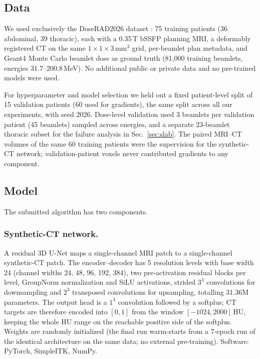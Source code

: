 \documentclass[runningheads]{llncs}
\begin{document}
\subsection{Data}
We used exclusively the DoseRAD2026 dataset \cite{doserad_data}: 75 training patients (36 abdominal, 39 thoracic), each with a 0.35\,T bSSFP planning MRI, a deformably registered CT on the same $1\times1\times3$\,mm$^3$ grid, per-beamlet plan metadata, and Geant4 \cite{geant4} Monte Carlo beamlet dose as ground truth (81{,}000 training beamlets, energies 31.7--200.8\,MeV). No additional public or private data and no pre-trained models were used.

For hyperparameter and model selection we held out a fixed patient-level split of 15 validation patients (60 used for gradients), the same split across all our experiments, with seed 2026. Dose-level validation used 3 beamlets per validation patient (45 beamlets) sampled across energies, and a separate 23-beamlet thoracic subset for the failure analysis in Sec.~\ref{sec:slab}. The paired MRI--CT volumes of the same 60 training patients were the supervision for the synthetic-CT network; validation-patient voxels never contributed gradients to any component.

\subsection{Model}
The submitted algorithm has two components.

\subsubsection{Synthetic-CT network.}
A residual 3D U-Net \cite{unet,unet3d} maps a single-channel MRI patch to a single-channel synthetic-CT patch. The encoder--decoder has 5 resolution levels with base width 24 (channel widths 24, 48, 96, 192, 384), two pre-activation residual blocks per level, GroupNorm normalization and SiLU activations, strided $3^3$ convolutions for downsampling and $2^3$ transposed convolutions for upsampling, totalling 31.36M parameters. The output head is a $1^3$ convolution followed by a softplus; CT targets are therefore encoded into $[0,1]$ from the window $[-1024, 2000]$\,HU, keeping the whole HU range on the reachable positive side of the softplus. Weights are randomly initialized (the final run warm-starts from a 7-epoch run of the identical architecture on the same data; no external pre-training). Software: PyTorch, SimpleITK, NumPy.
\end{document}
